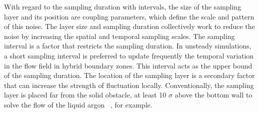 \documentclass[preprint,12pt]{elsarticle}
\begin{document}



With regard to the sampling duration with intervals, the size of the sampling layer and its position are coupling parameters, which define the scale and pattern of this noise. The layer size and sampling duration collectively work to reduce the noise by increasing the spatial and temporal sampling scales. The sampling interval is a factor that restricts the sampling duration. In unsteady simulations, a short sampling interval is preferred to update frequently the temporal variation in the flow field in hybrid boundary zones. This interval acts as the upper bound of the sampling duration. The location of the sampling layer is a secondary factor that can increase the strength of fluctuation locally. Conventionally, the sampling layer is placed far from the solid obstacle, at least 10 $\sigma$ above the bottom wall to solve the flow of the liquid argon ~\cite{Yen}, for example.

\end{document}
